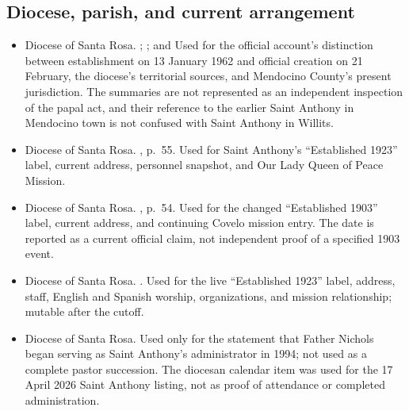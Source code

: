 \subsection{Diocese, parish, and current arrangement}

\begin{itemize}[leftmargin=1.35em,itemsep=0.2em,topsep=0.2em]
\item Diocese of Santa Rosa. ; ; and  Used for the official account's distinction between establishment on 13 January 1962 and official creation on 21 February, the diocese's territorial sources, and Mendocino County's present jurisdiction. The summaries are not represented as an independent inspection of the papal act, and their reference to the earlier Saint Anthony in Mendocino town is not confused with Saint Anthony in Willits.
\item Diocese of Santa Rosa. , p.~55. Used for Saint Anthony's ``Established 1923'' label, current address, personnel snapshot, and Our Lady Queen of Peace Mission.
\item Diocese of Santa Rosa. , p.~54. Used for the changed ``Established 1903'' label, current address, and continuing Covelo mission entry. The date is reported as a current official claim, not independent proof of a specified 1903 event.
\item Diocese of Santa Rosa. . Used for the live ``Established 1923'' label, address, staff, English and Spanish worship, organizations, and mission relationship; mutable after the cutoff.
\item Diocese of Santa Rosa.  Used only for the statement that Father Nichols began serving as Saint Anthony's administrator in 1994; not used as a complete pastor succession. The diocesan calendar item  was used for the 17 April 2026 Saint Anthony listing, not as proof of attendance or completed administration.

\end{itemize}
